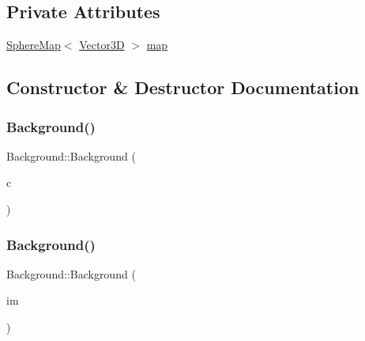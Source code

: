 \subsection*{Private Attributes}
\begin{DoxyCompactItemize}
\item 
\mbox{\hyperlink{classSphereMap}{Sphere\+Map}}$<$ \mbox{\hyperlink{classVector3D}{Vector3D}} $>$ \mbox{\hyperlink{classBackground_af0f03647aa08a06ba2a2105832c2097c}{map}}
\end{DoxyCompactItemize}


\subsection{Constructor \& Destructor Documentation}
\mbox{\label{classBackground_a153fe3ce08c90c24e7d08862952a6244}} 
\subsubsection{\texorpdfstring{Background()}{Background()}\hspace{0.1cm}{\footnotesize\ttfamily [1/2]}}
{\footnotesize\ttfamily Background\+::\+Background (\begin{DoxyParamCaption}\item[{\mbox{\hyperlink{classVector3D}{Vector3D}}}]{c }\end{DoxyParamCaption})\hspace{0.3cm}{\ttfamily [explicit]}}

\mbox{\label{classBackground_a46cb4a8649d0d0535c916eea458c25de}} 
\subsubsection{\texorpdfstring{Background()}{Background()}\hspace{0.1cm}{\footnotesize\ttfamily [2/2]}}
{\footnotesize\ttfamily Background\+::\+Background (\begin{DoxyParamCaption}\item[{const \mbox{\hyperlink{classSphereMap}{Sphere\+Map}}$<$ \mbox{\hyperlink{classVector3D}{Vector3D}} $>$ \&}]{im }\end{DoxyParamCaption})\hspace{0.3cm}{\ttfamily [explicit]}}



